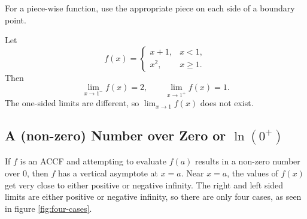 For a piece-wise function, use the appropriate piece on each side
of a boundary point.

\begin{exampleblock}
Let
$$f(x)=\begin{cases}x+1,&x<1,\\x^2,&x\geq1.\end{cases}$$
Then
$$\lim_{x\to1^-}f(x)=2,\qquad\lim_{x\to1^+}f(x)=1.$$
The one-sided limits are different, so $\displaystyle\lim_{x\to1}f(x)$
does not exist.
\end{exampleblock}

\subsection{A (non-zero) Number over Zero or \texorpdfstring{$\ln(0^+)$}{ln(0+)}}

If $f$ is an ACCF and attempting to evaluate $f(a)$ results in a non-zero number over 0, then $f$ has a vertical asymptote at $x=a$. Near $x=a$, the values of $f(x)$ get very close to either positive or negative infinity. The right and left sided limits are either positive or negative infinity, so there are only four cases, as seen in figure \ref{fig:four-cases}.

